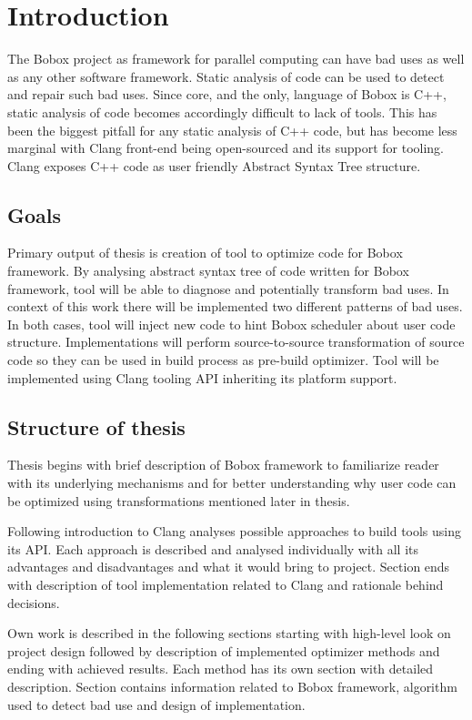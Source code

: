 \chapter{Introduction}
The Bobox project as framework for parallel computing can have bad uses as well as any other software framework. Static analysis of code can be used to detect and repair such bad uses. Since core, and the only, language of Bobox is C++, static analysis of code becomes accordingly difficult to lack of tools. This has been the biggest pitfall for any static analysis of C++ code, but has become less marginal with Clang front-end being open-sourced and its support for tooling. Clang exposes C++ code as user friendly Abstract Syntax Tree structure.

\section{Goals}
Primary output of thesis is creation of tool to optimize code for Bobox framework. By analysing abstract syntax tree of code written for Bobox framework, tool will be able to diagnose and potentially transform bad uses. In context of this work there will be implemented two different patterns of bad uses. In both cases, tool will inject new code to hint Bobox scheduler about user code structure. Implementations will perform source-to-source transformation of source code so they can be used in build process as pre-build optimizer. Tool will be implemented using Clang tooling API inheriting its platform support.

\section{Structure of thesis}
Thesis begins with brief description of Bobox framework to familiarize reader with its underlying mechanisms and for better understanding why user code can be optimized using transformations mentioned later in thesis.

Following introduction to Clang analyses possible approaches to build tools using its API. Each approach is described and analysed individually with all its advantages and disadvantages and what it would bring to project. Section ends with description of tool implementation related to Clang and rationale behind decisions.

Own work is described in the following sections starting with high-level look on project design followed by description of implemented optimizer methods and ending with achieved results. Each method has its own section with detailed description. Section contains information related to Bobox framework, algorithm used to detect bad use and design of implementation.